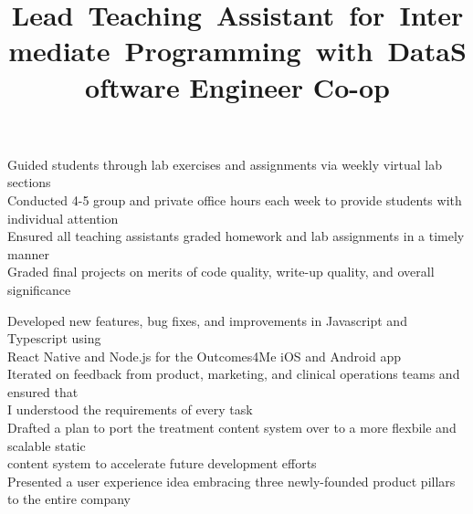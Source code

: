 \documentclass[resmargin]{res}
\begin{document}
\begin{resume}
\title{\mbox{\textbf{Lead Teaching Assistant for Intermediate Programming with Data}}}
\begin{position}
\hspace*{5mm}\textbullet\hspace*{1.5mm}Guided students through lab exercises and assignments via weekly virtual lab sections\\
\hspace*{5mm}\textbullet\hspace*{1.5mm}Conducted 4-5 group and private office hours each week to provide students with individual attention\\
\hspace*{5mm}\textbullet\hspace*{1.5mm}Ensured all teaching assistants graded homework and lab assignments in a timely manner\\
\hspace*{5mm}\textbullet\hspace*{1.5mm}Graded final projects on merits of code quality, write-up quality, and overall significance
\end{position}

\title{\textbf{Software Engineer Co-op}}
\begin{position}
\hspace*{5mm}\textbullet\hspace*{1.5mm}Developed new features, bug fixes, and improvements in Javascript and Typescript using
\\\hspace*{8.5mm}React Native and Node.js for the Outcomes4Me iOS and Android app\\
\hspace*{5mm}\textbullet\hspace*{1.5mm}Iterated on feedback from product, marketing, and clinical operations teams and ensured that
\\\hspace*{8.5mm}I understood the requirements of every task\\
\hspace*{5mm}\textbullet\hspace*{1.5mm}Drafted a plan to port the treatment content system over to a more flexbile and scalable static
\\\hspace*{8.5mm}content system to accelerate future development efforts\\
\hspace*{5mm}\textbullet\hspace*{1.5mm}Presented a user experience idea embracing three newly-founded product pillars to the entire company
\end{position}


\end{resume}
\end{document}
